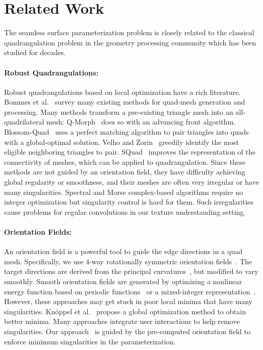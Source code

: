 \section{Related Work}
\label{related:param}
The seamless surface parameterization problem is closely related to the classical quadrangulation problem in the geometry processing community which has been studied for decades.

\paragraph*{Robust Quadrangulations:}
Robust quadrangulations based on local optimization have a rich literature. Bommes et al.~\cite{bommes2013quad} survey many existing methods for quad-mesh generation and processing.  Many methods transform a pre-existing triangle mesh into an all-quadrilateral mesh: Q-Morph~\cite{owen1999q} does so with an advancing front algorithm.  Blossom-Quad~\cite{remacle2012blossom} uses a perfect matching algorithm to pair triangles into quads with a global-optimal solution. Velho and Zorin~\cite{velho20014} greedily identify the most eligible neighboring triangles to pair. SQuad~\cite{gurung2011squad} improves the representation of the connectivity of meshes, which can be applied to quadrangulation.  Since these methods are not guided by an orientation field, they have difficulty achieving global regularity or smoothness, and their meshes are often very irregular or have many singularities.  Spectral and Morse complex-based algorithms \cite{dong2006spectral,zhang2010wave,ling2014spectral} require no integer optimization but singularity control is hard for them. Such irregularities cause problems for regular convolutions in our texture understanding setting.

\paragraph*{Orientation Fields:}
An orientation field is a powerful tool to guide the edge directions in a quad mesh. Specifically, we use 4-way rotationally symmetric orientation fields~\cite{ray2008n,lai2010metric}. The target directions are derived from the principal curvatures~\cite{cohen2003restricted,cazals2005estimating}, but modified to vary smoothly. Smooth orientation fields are generated by optimizing a nonlinear energy function based on periodic functions~\cite{hertzmann2000illustrating,ray2009geometry} or a mixed-integer representation~\cite{ray2008n,bommes2009mixed}. However, these approaches may get stuck in poor local minima that have many singularities. Kn\"{o}ppel et al.~\cite{knoppel2013globally} propose a global optimization method to obtain better minima. Many approaches \cite{ray2008n,ray2009geometry,crane2010trivial,diamanti2014designing,jiang2015frame} integrate user interactions to help remove singularities. Our approach~\cite{huang2018quadriflow} is guided by the pre-computed orientation field to enforce minimum singularities in the parameterization.

